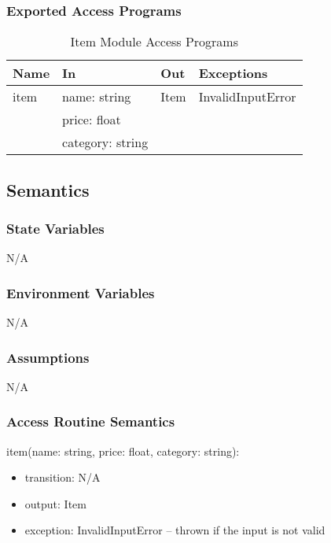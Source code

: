 \documentclass[12pt, titlepage]{article}
\begin{document}
\subsubsection{Exported Access Programs}

\begin{center}
  \begin{table}[H]
    \caption{Item Module Access Programs}
\begin{tabular}{p{4cm} p{4cm} p{4cm} p{4cm}}
\hline
\textbf{Name} & \textbf{In} & \textbf{Out} & \textbf{Exceptions} \\
\hline
item & name: string & Item & InvalidInputError \\
 & price: float &  &  \\
 & category: string &  &  \\
\hline
\end{tabular}
\end{table}
\end{center}

\subsection{Semantics}

\subsubsection{State Variables}
N/A

\subsubsection{Environment Variables}
N/A

\subsubsection{Assumptions}
N/A

\subsubsection{Access Routine Semantics}

\noindent item(name: string, price: float, category: string):
\begin{itemize}
\item transition: N/A
\item output: Item
\item exception: InvalidInputError -- thrown if the input is not valid
\end{itemize}
\end{document}
